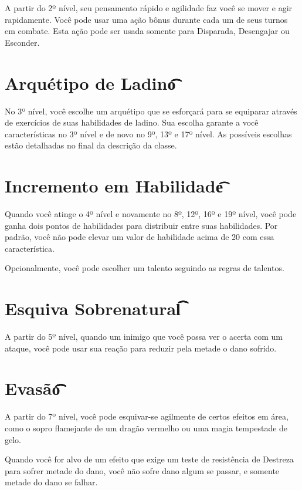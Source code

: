 \documentclass{RPG_Adventure}[2021/10/20]
\begin{document}
A partir do 2º nível, seu pensamento rápido e agilidade faz você se mover e agir
rapidamente. Você pode usar uma ação bônus durante cada um de seus turnos em
combate. Esta ação pode ser usada somente para Disparada, Desengajar ou
Esconder.

\section*{Arquétipo de Ladino\t\t\t\t\t\t}%
\label{sec:arquetipo_de_ladino}

No 3º nível, você escolhe um arquétipo que se esforçará para se equiparar
através de exercícios de suas habilidades de ladino. Sua escolha garante a você
características no 3º nível e de novo no 9º, 13º e 17º nível. As possíveis
escolhas estão detalhadas no final da descrição da classe.

\section*{Incremento em Habilidade\t\t}%
\label{sec:incremento_em_habilidade}

Quando você atinge o 4º nível e novamente no 8º, 12º, 16º e 19º nível, você pode
ganha dois pontos de habilidades para distribuir entre suas habilidades. Por
padrão, você não pode elevar um valor de habilidade acima de 20 com essa
característica.

Opcionalmente, você pode escolher um talento seguindo as regras de talentos.

\section*{Esquiva Sobrenatural\t\t\t\t\t}%
\label{sec:esquiva_sobrenatural}

A partir do 5º nível, quando um inimigo que você possa ver o acerta com um
ataque, você pode usar sua reação para reduzir pela metade o dano sofrido.

\section*{Evasão\t\t\t\t\t\t\t\t\t\t\t\t\t\t}%
\label{sec:evasao}

A partir do 7º nível, você pode esquivar-se agilmente de certos efeitos em área,
como o sopro flamejante de um dragão vermelho ou uma magia tempestade de gelo.

Quando você for alvo de um efeito que exige um teste de resistência de Destreza
para sofrer metade do dano, você não sofre dano algum se passar, e somente
metade do dano se falhar.
\end{document}
